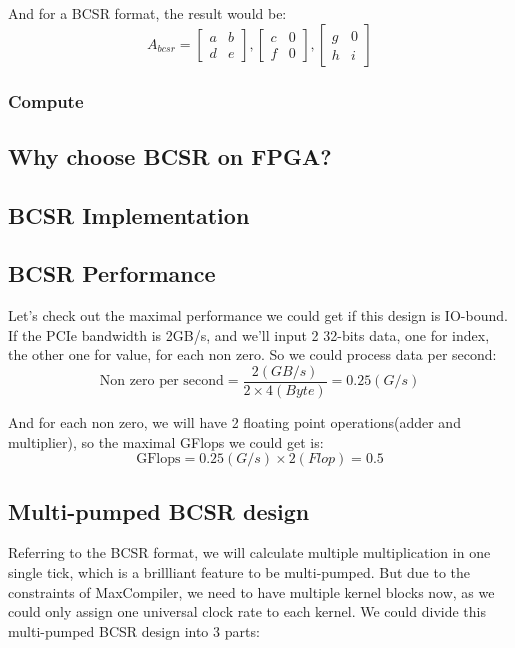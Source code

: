 \documentclass[a4paper, 10pt]{article}
\begin{document}
And for a BCSR format, the result would be:
\[
A_{bcsr} =
\begin{bmatrix}
	a & b\\
	d & e
\end{bmatrix}
,
\begin{bmatrix}
	c & 0\\
	f & 0
\end{bmatrix}
,
\begin{bmatrix}
	g & 0\\
	h & i
\end{bmatrix}
\]

\subsubsection{Compute}


\subsection{Why choose BCSR on FPGA?}

\subsection{BCSR Implementation}

\subsection{BCSR Performance}

Let's check out the maximal performance we could get if this design is IO-bound. If the PCIe bandwidth is 2GB/s, and we'll input 2 32-bits data, one for index, the other one for value, for each non zero. So we could process data per second:
$$ \text{Non zero per second} = \frac{2(GB/s)}{2\times4(Byte)} = 0.25(G/s) $$

And for each non zero, we will have 2 floating point operations(adder and multiplier), so the maximal GFlops we could get is:
$$ \text{GFlops} = 0.25 (G/s) \times 2(Flop) = 0.5 $$

\subsection{Multi-pumped BCSR design}

Referring to the BCSR format, we will calculate multiple multiplication in one single tick, which is a brillliant feature to be multi-pumped. But due to the constraints of MaxCompiler, we need to have multiple kernel blocks now, as we could only assign one universal clock rate to each kernel. We could divide this multi-pumped BCSR design into 3 parts:
\end{document}

